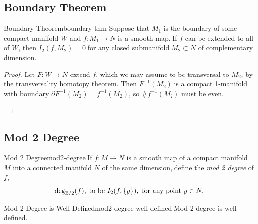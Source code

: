 \subsection{Boundary Theorem}

\begin{theorem}{Boundary Theorem}{boundary-thm}
    Suppose that $M_1$ is the boundary of some compact manifold $W$ and $f \colon M_1 \to N$ is a smooth map. If $f$ can be extended to all of $W$, then $I_2(f, M_2) = 0$ for any closed submanifold $M_2 \subset N$ of complementary dimension.
\end{theorem}

\begin{proof}
    Let $F \colon W \to N$ extend $f$, which we may assume to be transversal to $M_2$, by the transversality homotopy theorem. Then $F^{-1}(M_2)$ is a compact 1-manifold with boundary $\partial F^{-1}(M_2) = f^{-1}(M_2)$, so $\# f^{-1}(M_2)$ must be even.
    \begin{center}
    \end{center}
\end{proof}

\subsection{Mod 2 Degree}

\begin{definition}{Mod 2 Degree}{mod2-degree}
    If $f \colon M \to N$ is a smooth map of a compact manifold $M$ into a connected manifold $N$ of the same dimension, define the \emph{mod 2 degree} of $f$,
    \[
        \deg_{\mathbb{Z}/2}(f), \text{ to be } I_2(f, \{y\}), \text{ for any point } y \in N.
    \]
\end{definition}

\begin{theorem}{Mod 2 Degree is Well-Defined}{mod2-degree-well-defined}
    Mod 2 degree is well-defined.
\end{theorem}


